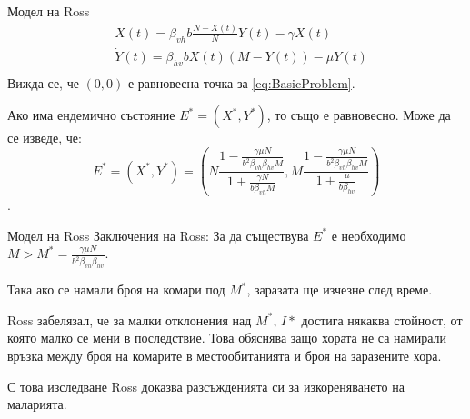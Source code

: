 \begin{frame}[t]{Модел на Ross}
  \begin{equation}
    \label{eq:BasicProblem}
    \begin{split}
      &\dot{X}(t) = \beta_{vh} b \frac{N-X(t)}{N} Y(t) - \gamma X(t) \\
      &\dot{Y}(t) = \beta_{hv} b X(t) (M-Y(t)) - \mu Y(t) \\
    \end{split}
  \end{equation}
  Вижда се, че $(0, 0)$ е равновесна точка за \ref{eq:BasicProblem}.

  Ако има ендемично състояние $E^* = (X^*, Y^*)$, то също е равновесно. Може да се изведе, че:
  \begin{equation*}
    E^* = (X^*, Y^*) = \left(N \frac{1 - \frac{\gamma \mu N}{b^2 \beta_{vh} \beta_{hv} M}}{1 + \frac{\gamma N}{b \beta_{vh} M}}, M \frac{1 - \frac{\gamma \mu N}{b^2 \beta_{vh} \beta_{hv} M}}{1 + \frac{\mu}{b \beta_{hv}}}\right)
  \end{equation*}.
\end{frame}

\begin{frame}[t]{Модел на Ross}
  Заключения на Ross:
  За да съществува $E^*$ е необходимо $M > M^* = \frac{\gamma \mu N}{b^2 \beta_{vh} \beta_{hv}}$.

  Така ако се намали броя на комари под $M^*$, заразата ще изчезне след време.

  Ross забелязал, че за малки отклонения над $M^*$, $I*$ достига някаква стойност, от която малко се мени в последствие.
  Това обяснява защо хората не са намирали връзка между броя на комарите в местообитанията и броя на заразените хора.

  С това изследване Ross доказва разсъжденията си за изкореняването на маларията.
\end{frame}
